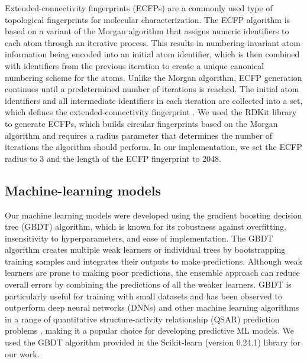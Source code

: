 \documentclass[10pt]{article}
\begin{document}
		
		Extended-connectivity fingerprints (ECFPs) are a commonly used type of topological fingerprints for molecular characterization. The ECFP algorithm is based on a variant of the Morgan algorithm that assigns numeric identifiers to each atom through an iterative process. This results in numbering-invariant atom information being encoded into an initial atom identifier, which is then combined with identifiers from the previous iteration to create a unique canonical numbering scheme for the atoms. Unlike the Morgan algorithm, ECFP generation continues until a predetermined number of iterations is reached. The initial atom identifiers and all intermediate identifiers in each iteration are collected into a set, which defines the extended-connectivity fingerprint \cite{rogers2010extended}. We used the RDKit library \cite{landrum2013rdkit} to generate ECFPs, which builds circular fingerprints based on the Morgan algorithm and requires a radius parameter that determines the number of iterations the algorithm should perform. In our implementation, we set the ECFP radius to 3 and the length of the ECFP fingerprint to 2048.
		
		\subsection{Machine-learning models}
		
		
		Our machine learning models were developed using the gradient boosting decision tree (GBDT) algorithm, which is known for its robustness against overfitting, insensitivity to hyperparameters, and ease of implementation. The GBDT algorithm creates multiple weak learners or individual trees by bootstrapping training samples and integrates their outputs to make predictions. Although weak learners are prone to making poor predictions, the ensemble approach can reduce overall errors by combining the predictions of all the weaker learners. GBDT is particularly useful for training with small datasets and has been observed to outperform deep neural networks (DNNs) and other machine learning algorithms in a range of quantitative structure-activity relationship (QSAR) prediction problems \cite{feng2023virtual,pun2022persistent}, making it a popular choice for developing predictive ML models. We used the GBDT algorithm provided in the Scikit-learn (version 0.24.1) library for our work.
		
\end{document}
